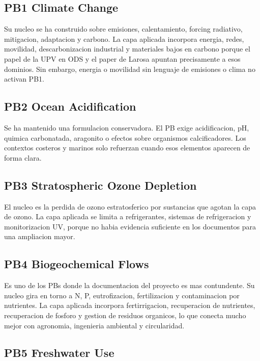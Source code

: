 \documentclass[11pt,a4paper]{article}
\begin{document}
\subsection{PB1 Climate Change}

Su nucleo se ha construido sobre emisiones, calentamiento, forcing radiativo, mitigacion, adaptacion y carbono. La capa aplicada incorpora energia, redes, movilidad, descarbonizacion industrial y materiales bajos en carbono porque el papel de la UPV en ODS y el paper de Larosa apuntan precisamente a esos dominios. Sin embargo, energia o movilidad sin lenguaje de emisiones o clima no activan PB1.

\subsection{PB2 Ocean Acidification}

Se ha mantenido una formulacion conservadora. El PB exige acidificacion, pH, quimica carbonatada, aragonito o efectos sobre organismos calcificadores. Los contextos costeros y marinos solo refuerzan cuando esos elementos aparecen de forma clara.

\subsection{PB3 Stratospheric Ozone Depletion}

El nucleo es la perdida de ozono estratosferico por sustancias que agotan la capa de ozono. La capa aplicada se limita a refrigerantes, sistemas de refrigeracion y monitorizacion UV, porque no habia evidencia suficiente en los documentos para una ampliacion mayor.

\subsection{PB4 Biogeochemical Flows}

Es uno de los PBs donde la documentacion del proyecto es mas contundente. Su nucleo gira en torno a N, P, eutrofizacion, fertilizacion y contaminacion por nutrientes. La capa aplicada incorpora fertirrigacion, recuperacion de nutrientes, recuperacion de fosforo y gestion de residuos organicos, lo que conecta mucho mejor con agronomia, ingenieria ambiental y circularidad.

\subsection{PB5 Freshwater Use}
\end{document}

